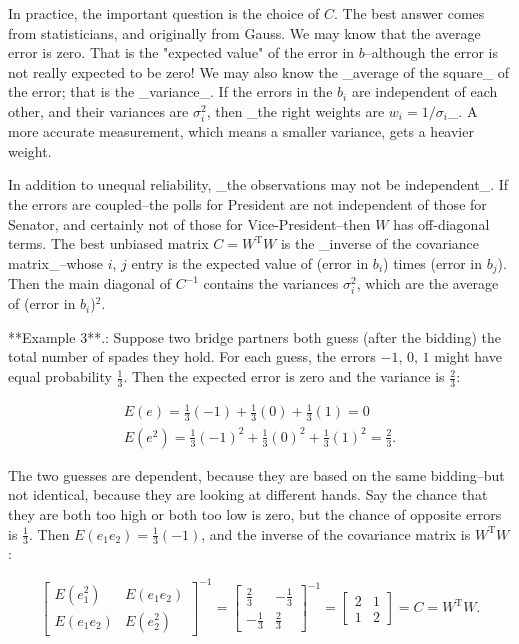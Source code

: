 In practice, the important question is the choice of \(C\). The best answer comes from statisticians, and originally from Gauss. We may know that the average error is zero. That is the "expected value" of the error in \(b\)--although the error is not really expected to be zero! We may also know the _average of the square_ of the error; that is the _variance_. If the errors in the \(b_{i}\) are independent of each other, and their variances are \(\sigma_{i}^{2}\), then _the right weights are \(w_{i}=1/\sigma_{i}\)_. A more accurate measurement, which means a smaller variance, gets a heavier weight.

In addition to unequal reliability, _the observations may not be independent_. If the errors are coupled--the polls for President are not independent of those for Senator, and certainly not of those for Vice-President--then \(W\) has off-diagonal terms. The best unbiased matrix \(C=W^{\mathrm{T}}W\) is the _inverse of the covariance matrix_--whose \(i\), \(j\) entry is the expected value of (error in \(b_{i}\)) times (error in \(b_{j}\)). Then the main diagonal of \(C^{-1}\) contains the variances \(\sigma_{i}^{2}\), which are the average of (error in \(b_{i}\))\({}^{2}\).

**Example 3**.: Suppose two bridge partners both guess (after the bidding) the total number of spades they hold. For each guess, the errors \(-1\), \(0\), \(1\) might have equal probability \(\frac{1}{3}\). Then the expected error is zero and the variance is \(\frac{2}{3}\):

\[\begin{array}{l}E(e)=\frac{1}{3}(-1)+\frac{1}{3}(0)+\frac{1}{3}(1)=0\\ E(e^{2})=\frac{1}{3}(-1)^{2}+\frac{1}{3}(0)^{2}+\frac{1}{3}(1)^{2}=\frac{2}{3} .\end{array}\]

The two guesses are dependent, because they are based on the same bidding--but not identical, because they are looking at different hands. Say the chance that they are both too high or both too low is zero, but the chance of opposite errors is \(\frac{1}{3}\). Then \(E(e_{1}e_{2})=\frac{1}{3}(-1)\), and the inverse of the covariance matrix is \(W^{\mathrm{T}}W\):

\[\begin{bmatrix}E(e_{1}^{2})&E(e_{1}e_{2})\\ E(e_{1}e_{2})&E(e_{2}^{2})\end{bmatrix}^{-1}=\begin{bmatrix}\frac{2}{3}&- \frac{1}{3}\\ -\frac{1}{3}&\frac{2}{3}\end{bmatrix}^{-1}=\begin{bmatrix}2&1\\ 1&2\end{bmatrix}=C=W^{\mathrm{T}}W.\]

